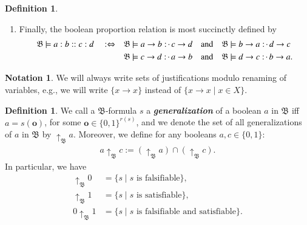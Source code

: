 \documentclass[11pt]{amsart}
\theoremstyle{definition} %
\newtheorem{definition}[theorem]{Definition}
\newtheorem{notation}[theorem]{Notation}
\newcommand{\righttherefore}{:\joinrel\cdot\,}
\begin{document}
\begin{definition}
\begin{enumerate}
	\item\label{i:abcd} Finally, the boolean proportion relation is most succinctly defined by
	\begin{align*} 
		\mathfrak B \models a:b::c:d \quad:\Leftrightarrow\quad 
            &\mathfrak B \models a\to b\righttherefore c\to d \quad\text{and}\quad \mathfrak B \models b\to a\righttherefore d\to c\\
            &\mathfrak B \models c\to d\righttherefore a\to b \quad\text{and}\quad \mathfrak B \models d\to c\righttherefore b\to a.
	\end{align*}
\end{enumerate}
\end{definition}


\begin{notation} We will always write sets of justifications modulo renaming of variables, e.g., we will write $\{x\to x\}$ instead of $\{x\to x\mid x\in X\}$.
\end{notation}

\begin{definition} We call a $\mathfrak B$-formula $s$ a \textit{\textbf{generalization}} of a boolean $a$ in $\mathfrak B$ iff $a= s(\mathbf o)$, for some $\mathbf o\in\{0,1\}^{r(s)}$, and we denote the set of all generalizations of $a$ in $\mathfrak B$ by $\uparrow_\mathfrak B a$. Moreover, we define for any booleans $a,c\in\{0,1\}$:
\begin{align*} 
	a\uparrow_\mathfrak B c:=(\uparrow_\mathfrak B a)\cap (\uparrow_\mathfrak B c).
\end{align*} In particular, we have
\begin{align*} 
	\uparrow_\mathfrak B 0&=\{ s\mid s\text{ is falsifiable}\},\\
	\uparrow_\mathfrak B 1&=\{ s\mid s\text{ is satisfiable}\},\\
	0\uparrow_\mathfrak B 1&=\{ s\mid s\text{ is falsifiable and satisfiable}\}.
\end{align*}
\end{definition}
\end{document}
